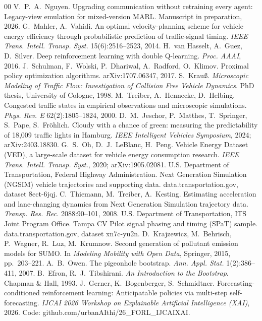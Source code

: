 \begin{thebibliography}{00}
 V.~P.~A.~Nguyen. Upgrading communication without retraining every agent: Legacy-view emulation for mixed-version MARL. Manuscript in preparation, 2026.
 G.~Mahler, A.~Vahidi. An optimal velocity-planning scheme for vehicle energy efficiency through probabilistic prediction of traffic-signal timing. \emph{IEEE Trans. Intell. Transp. Syst.} 15(6):2516--2523, 2014.
 H.~van Hasselt, A.~Guez, D.~Silver. Deep reinforcement learning with double Q-learning. \emph{Proc. AAAI}, 2016.
 J.~Schulman, F.~Wolski, P.~Dhariwal, A.~Radford, O.~Klimov. Proximal policy optimization algorithms. arXiv:1707.06347, 2017.
 S.~Krau{\ss}. \emph{Microscopic Modeling of Traffic Flow: Investigation of Collision Free Vehicle Dynamics}. PhD thesis, University of Cologne, 1998.
 M.~Treiber, A.~Hennecke, D.~Helbing. Congested traffic states in empirical observations and microscopic simulations. \emph{Phys. Rev. E} 62(2):1805--1824, 2000.
 D.~M.~Jeschor, P.~Matthes, T.~Springer, S.~Pape, S.~Fr\"ohlich. Cloudy with a chance of green: measuring the predictability of 18,009 traffic lights in Hamburg. \emph{IEEE Intelligent Vehicles Symposium}, 2024; arXiv:2403.18830.
 G.~S.~Oh, D.~J.~LeBlanc, H.~Peng. Vehicle Energy Dataset (VED), a large-scale dataset for vehicle energy consumption research. \emph{IEEE Trans. Intell. Transp. Syst.}, 2020; arXiv:1905.02081.
 U.S. Department of Transportation, Federal Highway Administration. Next Generation Simulation (NGSIM) vehicle trajectories and supporting data. data.transportation.gov, dataset 8ect-6jqj.
 C.~Thiemann, M.~Treiber, A.~Kesting. Estimating acceleration and lane-changing dynamics from Next Generation Simulation trajectory data. \emph{Transp. Res. Rec.} 2088:90--101, 2008.
 U.S. Department of Transportation, ITS Joint Program Office. Tampa CV Pilot signal phasing and timing (SPaT) sample. data.transportation.gov, dataset xn7c-yu2n.
 D.~Krajzewicz, M.~Behrisch, P.~Wagner, R.~Luz, M.~Krumnow. Second generation of pollutant emission models for SUMO. In \emph{Modeling Mobility with Open Data}, Springer, 2015, pp.~203--221.
 A.~B.~Owen. The pigeonhole bootstrap. \emph{Ann. Appl. Stat.} 1(2):386--411, 2007.
 B.~Efron, R.~J.~Tibshirani. \emph{An Introduction to the Bootstrap}. Chapman \& Hall, 1993.
 J.~Gerner, K.~Bogenberger, S.~Schmidtner. Forecasting-conditioned reinforcement learning: Anticipatable policies via multi-step self-forecasting. \emph{IJCAI 2026 Workshop on Explainable Artificial Intelligence (XAI)}, 2026. Code: github.com/urbanAIthi/26\_FORL\_IJCAIXAI.

\end{thebibliography}
